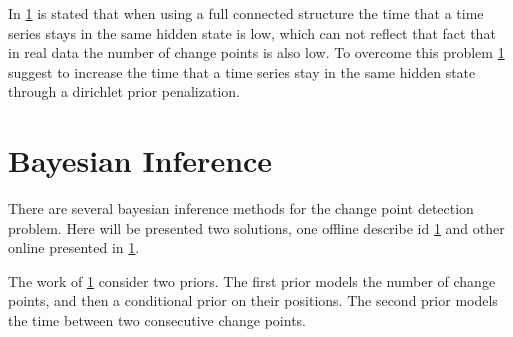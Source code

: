 In \ref{} is stated that when using a full connected structure the time that a time series stays in the same hidden state is low, which can not reflect that fact that in real data the number of change points is also low. To overcome this problem \ref{} suggest to increase the time that a time series stay in the same hidden state through a dirichlet prior penalization.


\section{Bayesian Inference}

There are several bayesian inference methods for the change point detection problem. Here will be presented two solutions, one offline describe id \ref{} and other online presented in \ref{}.

The work of \ref{} consider two priors. The first prior models the number of change points, and then a conditional prior on their positions. The second prior models the time between two consecutive change points.
